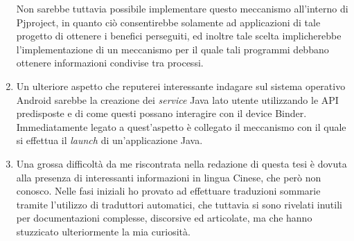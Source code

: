 \begin{enumerate}
	Non sarebbe tuttavia possibile implementare questo meccanismo all'interno
	di Pjproject, in quanto ciò consentirebbe solamente ad applicazioni
	di tale progetto di ottenere i benefici perseguiti, ed inoltre tale
	scelta implicherebbe l'implementazione di un meccanismo per il quale
	tali programmi debbano ottenere informazioni condivise tra processi.
\item Un ulteriore aspetto che reputerei interessante indagare sul sistema
	operativo Android sarebbe la creazione dei \textit{service} Java lato utente
	utilizzando le API predisposte e di come questi possano interagire
	con il device Binder. Immediatamente legato a quest'aspetto è collegato
	il meccanismo con il quale si effettua il \textit{launch} di un'applicazione
	Java.
\item Una grossa difficoltà da me riscontrata nella redazione di questa tesi 
	è dovuta alla presenza di interessanti informazioni in lingua Cinese,
	che però non conosco. Nelle fasi iniziali ho provato ad effettuare traduzioni
	sommarie tramite l'utilizzo di traduttori automatici, che tuttavia
	si sono rivelati inutili per documentazioni complesse, discorsive ed
	articolate, ma che hanno stuzzicato ulteriormente la mia curiosità.
\end{enumerate}
